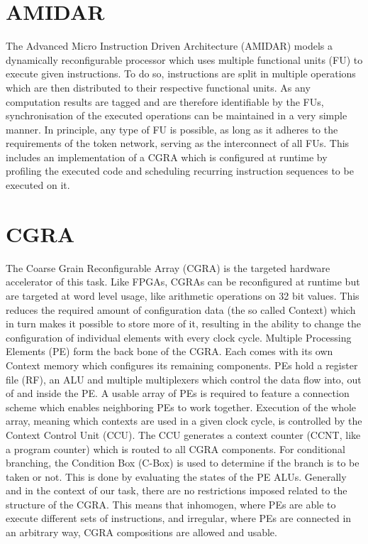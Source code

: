 	\section{AMIDAR} %
	\label{sec:intro_amidar}
		The Advanced Micro Instruction Driven Architecture (AMIDAR) models a dynamically reconfigurable processor which uses multiple functional units (FU) to execute given instructions. 
		To do so, instructions are split in multiple operations which are then distributed to their respective functional units. As any computation results are tagged and are therefore identifiable by the FUs, synchronisation of the executed operations can be maintained in a very simple manner. 
		In principle, any type of FU is possible, as long as it adheres to the requirements of the token network, serving as the interconnect of all FUs. This includes an implementation of a CGRA which is configured at runtime by profiling the executed code and scheduling recurring instruction sequences to be executed on it.

	\section{CGRA} %
	\label{sec:intro_cgra}
		The Coarse Grain Reconfigurable Array (CGRA) is the targeted hardware accelerator of this task. Like FPGAs, CGRAs can be reconfigured at runtime but are targeted at word level usage, like arithmetic operations on \num{32} bit values. This reduces the required amount of configuration data (the so called Context) which in turn makes it possible to store more of it, resulting in the ability to change the configuration of individual elements with every clock cycle.
		Multiple Processing Elements (PE) form the back bone of the CGRA. Each comes with its own Context memory which configures its remaining components. PEs hold a register file (RF), an ALU and multiple multiplexers which control the data flow into, out of and inside the PE. A usable array of PEs is required to feature a connection scheme which enables neighboring PEs to work together.
		Execution of the whole array, meaning which contexts are used in a given clock cycle, is controlled by the Context Control Unit (CCU). The CCU generates a context counter (CCNT, like a program counter) which is routed to all CGRA components. For conditional branching, the Condition Box (C-Box) is used to determine if the branch is to be taken or not. This is done by evaluating the states of the PE ALUs.
		Generally and in the context of our task, there are no restrictions imposed related to the structure of the CGRA. This means that inhomogen, where PEs are able to execute different sets of instructions, and irregular, where PEs are connected in an arbitrary way, CGRA compositions are allowed and usable.

